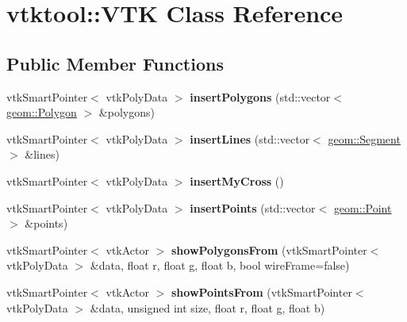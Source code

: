 \hypertarget{classvtktool_1_1VTK}{}\section{vtktool\+:\+:V\+TK Class Reference}
\label{classvtktool_1_1VTK}
\subsection*{Public Member Functions}
\begin{DoxyCompactItemize}
\item 
vtk\+Smart\+Pointer$<$ vtk\+Poly\+Data $>$ {\bfseries insert\+Polygons} (std\+::vector$<$ \hyperlink{classgeom_1_1Polygon}{geom\+::\+Polygon} $>$ \&polygons)\hypertarget{classvtktool_1_1VTK_a90bc9aad6048ff02f839cfee48911437}{}\label{classvtktool_1_1VTK_a90bc9aad6048ff02f839cfee48911437}

\item 
vtk\+Smart\+Pointer$<$ vtk\+Poly\+Data $>$ {\bfseries insert\+Lines} (std\+::vector$<$ \hyperlink{classgeom_1_1Segment}{geom\+::\+Segment} $>$ \&lines)\hypertarget{classvtktool_1_1VTK_afed47b58fb15a336bfc23378a04c7290}{}\label{classvtktool_1_1VTK_afed47b58fb15a336bfc23378a04c7290}

\item 
vtk\+Smart\+Pointer$<$ vtk\+Poly\+Data $>$ {\bfseries insert\+My\+Cross} ()\hypertarget{classvtktool_1_1VTK_a8c9e87ff43f24c2fa3d0b0e3a1f86055}{}\label{classvtktool_1_1VTK_a8c9e87ff43f24c2fa3d0b0e3a1f86055}

\item 
vtk\+Smart\+Pointer$<$ vtk\+Poly\+Data $>$ {\bfseries insert\+Points} (std\+::vector$<$ \hyperlink{classgeom_1_1Point}{geom\+::\+Point} $>$ \&points)\hypertarget{classvtktool_1_1VTK_a182ea87b0eebb8999285abd32f426638}{}\label{classvtktool_1_1VTK_a182ea87b0eebb8999285abd32f426638}

\item 
vtk\+Smart\+Pointer$<$ vtk\+Actor $>$ {\bfseries show\+Polygons\+From} (vtk\+Smart\+Pointer$<$ vtk\+Poly\+Data $>$ \&data, float r, float g, float b, bool wire\+Frame=false)\hypertarget{classvtktool_1_1VTK_a43579b6e1439118e26cb5d92e1272c7a}{}\label{classvtktool_1_1VTK_a43579b6e1439118e26cb5d92e1272c7a}

\item 
vtk\+Smart\+Pointer$<$ vtk\+Actor $>$ {\bfseries show\+Points\+From} (vtk\+Smart\+Pointer$<$ vtk\+Poly\+Data $>$ \&data, unsigned int size, float r, float g, float b)\hypertarget{classvtktool_1_1VTK_a63a62fe1bcd07c147eaabbf62ee196bb}{}\label{classvtktool_1_1VTK_a63a62fe1bcd07c147eaabbf62ee196bb}


\end{DoxyCompactItemize}
